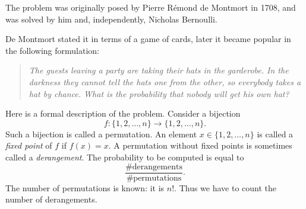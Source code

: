 

\setcounter{section}{5}
\setcounter{subsection}{2}
\setcounter{dfn}{2}

The problem was originally posed by Pierre R\'emond de Montmort in 1708, and was solved by him and, independently, Nicholas Bernoulli.

De Montmort stated it in terms of a game of cards, later it became popular in the following formulation:

\begin{quote}
\emph{The guests leaving a party are taking their hats in the garderobe.
In the darkness they cannot tell the hats one from the other, so everybody takes a hat by chance.
What is the probability that nobody will get his own hat?}
\end{quote}

Here is a formal description of the problem.
Consider a bijection
\[
f \colon \{1, 2, \ldots, n\} \to \{1, 2, \ldots, n\}.
\]
Such a bijection is called a permutation.
An element $x \in \{1, 2, \ldots, n\}$ is called a \emph{fixed point} of $f$ if $f(x) = x$.
A permutation without fixed points is sometimes called a \emph{derangement}.
The probability to be computed is equal to
\[
\frac{\#\text{derangements}}{\#\text{permutations}}.
\]
The number of permutations is known: it is $n!$.
Thus we have to count the number of derangements.




